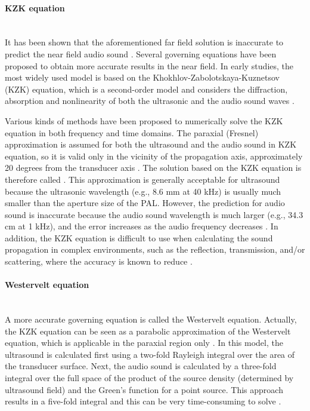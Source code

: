 \paragraph{KZK equation}\mbox{}\\
It has been shown {that} the aforementioned far field solution %
is inaccurate to predict the near field audio sound \cite{Zhong2021FieldWesterveltFar}.
Several governing equations have been proposed to obtain more accurate results in the near field.
In early studies, the most widely used model is based on the Khokhlov-Zabolotskaya-Kuznetsov (KZK) equation, which is a second-order model and considers the diffraction, absorption and nonlinearity of both the ultrasonic and {the} audio sound waves \cite{Zabolotskaya1969QuasiplaneWavesNonlinear, Kuznetsov1971EquationsNonlinearAcoustics, Hamilton2008NonlinearAcoustics}.

Various kinds of methods have been proposed to numerically solve {the} KZK equation in both frequency \cite{Aanonsen1984DistortionHarmonicGeneration, Kamakura1989NonlinearlyGeneratedSpectral, Kamakura1992HarmonicGenerationFinite} and time \cite{Lee1993NumericalSolutionKZK, Averkiou1993SelfDemodulationAmplitude} domains.
The paraxial (Fresnel) approximation is assumed for both the ultrasound and the audio sound in KZK equation, so it is valid only in the vicinity of the propagation axis, approximately 20 degrees  from the transducer axis  \cite{Hamilton2008NonlinearAcoustics}. 
The solution based on {the} KZK equation is therefore called .
This approximation is generally acceptable for ultrasound because the ultrasonic wavelength (e.g., 8.6 mm at 40 kHz) is usually much smaller than the aperture size of the PAL. 
However, the prediction for audio sound is inaccurate because the audio sound wavelength is much larger (e.g., 34.3 cm at 1 kHz), and the error increases as the audio frequency decreases \cite{Cervenka2013NonparaxialModelParametric}.
In addition, the KZK equation is difficult {to use when calculating} the sound propagation in complex environments, such as the reflection, transmission, and/or scattering, {where the accuracy is known to reduce} \cite{Li2019NumericalExperimentalStudies}.

\paragraph{Westervelt equation}\mbox{}\\
A more accurate governing equation is called the Westervelt equation.
Actually, the KZK equation can be seen as a parabolic approximation of the Westervelt equation, which is applicable in the paraxial region {only} \cite{Aanonsen1984DistortionHarmonicGeneration, Cervenka2013NonparaxialModelParametric}.
In this model, the ultrasound is calculated first {using} a two-fold Rayleigh integral over the area of the transducer surface. 
{Next}, the audio sound is calculated by a three-fold integral over the full space of the product of the source density (determined by ultrasound field) and the Green's function for a point source.
This {approach results in} a five-fold integral and {this can be} very time-consuming to {solve} \cite{Zhong2020SphericalExpansionAudio}.

